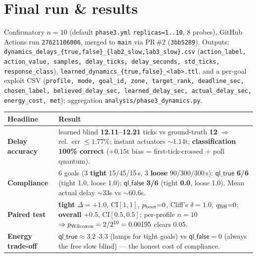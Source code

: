 \documentclass[10pt,a4paper]{article}
\newcommand{\file}[1]{\texttt{\small #1}}
\newcommand{\kw}[1]{\textbf{#1}}
\begin{document}
\section{Final run \& results}
Confirmatory \(n{=}10\) (default \file{phase3.yml} \texttt{replicas=1..10}, 8 probes), GitHub Actions run
\texttt{27621106006}, merged to \texttt{main} via PR\,\#2 (\texttt{3bb5289}). Outputs:
\file{dynamics\_delays\_\{true,false\}\_\{lab2\_slow,lab3\_slow\}.csv}
(\texttt{action\_label, action\_value, samples, delay\_ticks, delay\_seconds, std\_ticks, response\_class}),
\file{learned\_dynamics\_\{true,false\}\_<lab>.ttl}, and a per-goal exploit CSV
(\texttt{profile, mode, goal\_id, zone, target\_rank, deadline\_sec, chosen\_label, believed\_delay\_sec,
learned\_delay\_sec, actual\_delay\_sec, energy\_cost, met}); aggregation \file{analysis/phase3\_dynamics.py}.

\begin{center}\footnotesize
\begin{tabular}{@{}lp{8.7cm}@{}}
\toprule
\rowcolor{boxgrey} Headline & Result\\
\midrule
\kw{Delay accuracy} & learned blind \kw{12.11--12.21} ticks vs ground-truth \kw{12} \(\Rightarrow\) rel.\ err \(\le1.77\%\); instant actuators \(\sim\!1.14\)t; \kw{classification 100\% correct} (\(+0.15\)t bias = first-tick-crossed + poll quantum).\\
\kw{Compliance} & 6 goals (3 \kw{tight} 15/45/15\,s, 3 \kw{loose} 90/300/300\,s): \(\textsf{ql\_true}\) \kw{6/6} (tight 1.0, loose 1.0); \(\textsf{ql\_false}\) \kw{3/6} (tight \kw{0.0}, loose 1.0). Mean actual delay \(\sim\!33\)s vs \(\sim\!60.6\)s.\\
\kw{Paired test} & \kw{tight} \(\Delta=+1.0\), CI\([1,1]\), \(p_{\rm boot}{=}0\), Cliff's \(\delta{=}1.0\), \(q_{\rm BH}{=}0\); \kw{overall} \(+0.5\), CI\([0.5,0.5]\); per-profile \(n{=}10\) \(\Rightarrow p_{\rm Wilcoxon}=2/2^{10}=0.00195\) clears 0.05.\\
\kw{Energy trade-off} & \(\textsf{ql\_true}\approx 3.2\text{--}3.3\) (lamps for tight goals) vs \(\textsf{ql\_false}=0\) (always the free slow blind) — the honest cost of compliance.\\
\bottomrule
\end{tabular}
\end{center}
\end{document}
